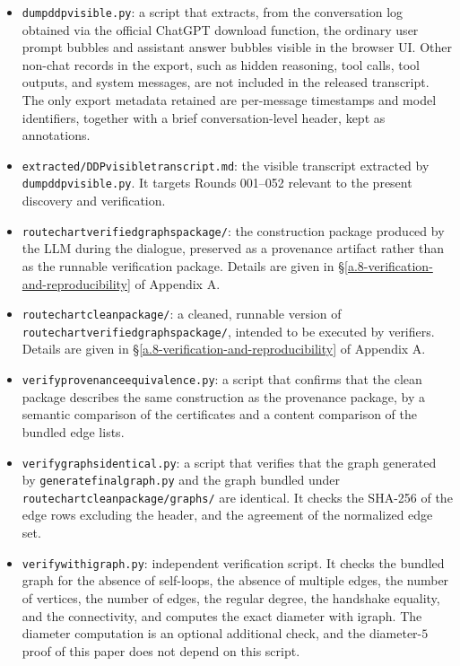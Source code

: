 \documentclass[11pt]{article}
\theoremstyle{definition}
\theoremstyle{remark}
\providecommand{\tightlist}{\setlength{\itemsep}{0pt}\setlength{\parskip}{0pt}}
\renewcommand{\_}{\textunderscore\allowbreak}
\begin{document}
\begin{itemize}
\tightlist
\item
  \texttt{dump\_ddp\_visible.py}: a script that extracts, from the
  conversation log obtained via the official ChatGPT download function,
  the ordinary user prompt bubbles and assistant answer bubbles visible
  in the browser UI. Other non-chat records in the export, such as hidden
  reasoning, tool calls, tool outputs, and system messages, are not
  included in the released transcript. The only export metadata retained
  are per-message timestamps and model identifiers, together with a brief
  conversation-level header, kept as annotations.
\item
  \texttt{extracted/DDP\_visible\_transcript.md}: the visible transcript
  extracted by \texttt{dump\_ddp\_visible.py}. It targets Rounds 001--052
  relevant to the present discovery and verification.
\item
  \texttt{route\_chart\_verified\_graphs\_package/}: the construction
  package produced by the LLM during the dialogue, preserved as a
  provenance artifact rather than as the runnable verification package.
  Details are given in \S\ref{a.8-verification-and-reproducibility} of Appendix A.
\item
  \texttt{route\_chart\_clean\_package/}: a cleaned, runnable version of
  \texttt{route\_chart\_verified\_graphs\_package/}, intended to be
  executed by verifiers. Details are given in \S\ref{a.8-verification-and-reproducibility} of Appendix A.
\item
  \texttt{verify\_provenance\_equivalence.py}: a script that confirms that
  the clean package describes the same construction as the provenance
  package, by a semantic comparison of the certificates and a content
  comparison of the bundled edge lists.
\item
  \texttt{verify\_graphs\_identical.py}: a script that verifies that the
  graph generated by \texttt{generate\_final\_graph.py} and the graph bundled
  under \texttt{route\_chart\_clean\_package/graphs/} are identical. It checks
  the SHA-256 of the edge rows excluding the header, and the agreement of the
  normalized edge set.
\item
  \texttt{verify\_with\_igraph.py}:
  independent verification script. It checks the bundled graph for the
  absence of self-loops, the absence of multiple edges, the number of
  vertices, the number of edges, the regular degree, the handshake
  equality, and the connectivity, and computes the exact diameter with igraph. The diameter computation is an optional additional check,
  and the diameter-\(5\) proof of this paper does not depend on this script.
\end{itemize}




\end{document}
